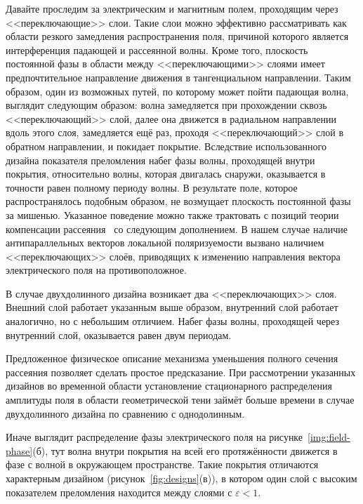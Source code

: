 Давайте проследим за электрическим и магнитным полем, проходящим
через <<переключающие>> слои.  Такие слои можно эффективно
рассматривать как области резкого замедления распространения поля,
причиной которого является интерференция падающей и рассеянной волны.
Кроме того, плоскость постоянной фазы в области между
<<переключающими>> слоями имеет предпочтительное направление движения
в тангенциальном направлении.  Таким образом, один из возможных путей,
по которому может пойти падающая волна, выглядит следующим образом:
волна замедляется при прохождении сквозь <<переключающий>> слой, далее
она движется в радиальном направлении вдоль этого слоя,
замедляется ещё раз, проходя <<переключающий>> слой в обратном
направлении, и покидает покрытие.  Вследствие использованного дизайна
показателя преломления  набег фазы волны, проходящей внутри покрытия,
относительно волны, которая двигалась снаружи, оказывается в точности
равен полному периоду волны.  В результате поле, которое
распространялось подобным образом, не возмущает плоскость постоянной
фазы за мишенью.  Указанное поведение можно также трактовать с позиций
теории компенсации рассеяния~\cite{alu} со следующим дополнением.  В
нашем случае наличие антипараллельных векторов локальной
поляризуемости  вызвано наличием <<переключающих>> слоёв, приводящих к
изменению направления вектора электрического поля на противоположное.

В случае двухдолинного дизайна возникает два <<переключающих>> слоя.
Внешний слой работает указанным выше образом, внутренний слой работает
аналогично, но с небольшим отличием.  Набег фазы волны, проходящей
через внутренний слой, оказывается равен двум периодам.

Предложенное физическое описание механизма уменьшения полного сечения
рассеяния позволяет сделать простое предсказание.  При рассмотрении
указанных дизайнов во временной области установление стационарного
распределения амплитуды поля в области геометрической тени займёт
больше времени в случае двухдолинного дизайна по сравнению с
однодолинным.  

Иначе выглядит распределение фазы электрического поля на
рисунке~\ref{img:field-phase}(б), тут волна внутри покрытия на всей его
протяжённости движется в фазе с волной в окружающем пространстве.  Такие покрытия отличаются характерным дизайном
(рисунок~\ref{fig:designs}(в)), в котором один слой с высоким
показателем преломления находится между слоями с ${\varepsilon<1}$.


